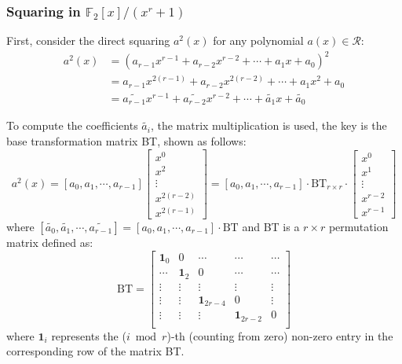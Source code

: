 \documentclass[runningheads]{llncs}
\begin{document}
\subsubsection{Squaring in $\mathbb{F}_2[x]/(x^r+1)$}
First, consider the direct squaring $a^2(x)$ for any polynomial $a(x)\in \mathcal{R}$:
\begin{align}
    a^2(x) &= (a_{r-1}x^{r-1}+a_{r-2}x^{r-2}+\cdots + a_{1}x + a_0)^2\\
    &= a_{r-1}x^{2(r-1)}+a_{r-2}x^{2(r-2)}+\cdots + a_1x^2 + a_0\\
    &= \widetilde{a_{r-1}}x^{r-1}+\widetilde{a_{r-2}}x^{r-2}+\cdots + \widetilde{a_{1}}x +\widetilde{a_0}
\end{align}

To compute the coefficients $\widetilde{a_{i}}$, the matrix multiplication is used, the key is the base transformation matrix BT, shown as follows:
\[
a^2(x)= [{a_{0}},{a_{1}},\cdots,{a_{r-1}}]\left[ \begin{array}{c}
x^{0} \\
x^{2} \\
\vdots\\
x^{2(r-2)}\\
x^{2(r-1)}
\end{array}
\right ]
=
[{a_0},{a_1},\cdots,{a_{r-1}}]
\cdot \text{BT}_{r\times r} \cdot
\left[ \begin{array}{c}
x^{0} \\
x^{1} \\
\vdots\\
x^{r-2}\\
x^{r-1}
\end{array}
\right ]
\]
where $[\widetilde{a_{0}},\widetilde{a_{1}},\cdots,\widetilde{a_{r-1}}]=[{a_{0}},{a_{1}},\cdots,{a_{r-1}}]
\cdot \text{BT}$ and BT is a $r\times r$ permutation matrix defined as:
\[
\text{BT} =
\left[ \begin{array}{ccccc}
\mathbf{1}_{0}&0&\cdots&\cdots&\cdots  \\
\cdots&\mathbf{1}_{2}&0 &\cdots&\cdots \\
\vdots&\vdots&\vdots&\vdots&\vdots\\
\vdots&\vdots&\mathbf{1}_{2r-4}&0&\vdots\\
\vdots&\vdots&\vdots&\mathbf{1}_{2r-2}&0\\
\end{array}
\right ]
\]
where $\mathbf{1}_{i}$ represents the ($i\bmod r$)-th (counting from zero) non-zero entry in the corresponding row of the matrix BT.
\end{document}
